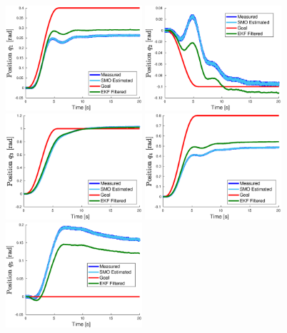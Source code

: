 \documentclass[a4paper, 10pt]{article}
\begin{document}
\begin{figure}
  \centering
  \includegraphics[width=0.45\textwidth]{Figures/result_q1.eps}
  \includegraphics[width=0.45\textwidth]{Figures/result_q2.eps}
  \includegraphics[width=0.45\textwidth]{Figures/result_q3.eps}
  \includegraphics[width=0.45\textwidth]{Figures/result_q4.eps}
  \includegraphics[width=0.45\textwidth]{Figures/result_q5.eps}

\end{figure}
\end{document}
